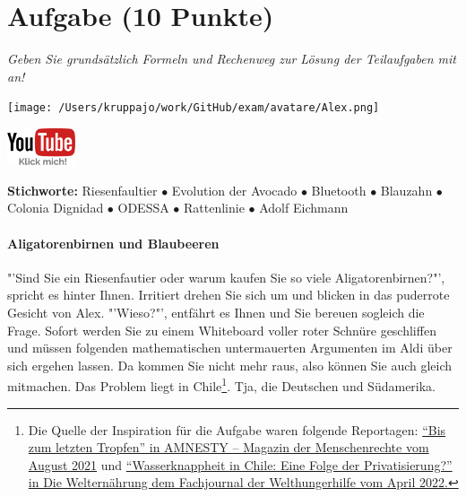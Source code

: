\documentclass[a4paper, 9pt]{scrartcl}\usepackage[]{graphicx}\usepackage[]{xcolor}
\begin{document}
 
\clearpage

\section{Aufgabe \hfill (10 Punkte)}

\textit{Geben Sie grundsätzlich Formeln und Rechenweg zur Lösung der Teilaufgaben mit an!} \\[1Ex]
 

 
\begin{minipage}[t]{0.5\textwidth}
\texttt{[image: /Users/kruppajo/work/GitHub/exam/avatare/Alex.png]}
\end{minipage}
\begin{minipage}[t]{0.5\textwidth}
\hfill
\href{https://youtu.be/https://youtu.be/k2G52hMIfqk}{\includegraphics[width = 2cm]{img/youtube}}
\end{minipage}

{\tiny\textbf{Stichworte:} Riesenfaultier $\bullet$ Evolution der Avocado $\bullet$ Bluetooth $ \bullet$ Blauzahn $\bullet$ Colonia Dignidad $\bullet$ ODESSA $\bullet$ Rattenlinie $\bullet$ Adolf Eichmann}



\paragraph{Aligatorenbirnen und Blaubeeren}



"'Sind Sie ein Riesenfautier oder warum kaufen Sie so viele Aligatorenbirnen?"', spricht es hinter Ihnen. Irritiert drehen Sie sich um und blicken in das puderrote Gesicht von Alex. "'Wieso?"', entfährt es Ihnen und Sie bereuen sogleich die Frage. Sofort werden Sie zu einem Whiteboard voller roter Schnüre geschliffen und müssen folgenden mathematischen untermauerten Argumenten im Aldi über sich ergehen lassen. Da kommen Sie nicht mehr raus, also können Sie auch gleich mitmachen. Das Problem liegt in Chile\footnote{Die Quelle der Inspiration für die Aufgabe waren folgende Reportagen: \href{https://www.amnesty.ch/de/ueber-amnesty/publikationen/magazin-amnesty/2021-3/bis-zum-letzten-tropfen}{"`Bis zum letzten Tropfen"' in AMNESTY – Magazin der Menschenrechte vom August 2021} und \href{https://www.welthungerhilfe.de/welternaehrung/rubriken/klima-ressourcen/wassernot-in-chile-eine-folge-der-privatisierung}{"`Wasserknappheit in Chile: Eine Folge der Privatisierung?"' in Die Welternährung dem Fachjournal der Welthungerhilfe vom April 2022.}}. Tja, die Deutschen und Südamerika.\\
\end{document}

